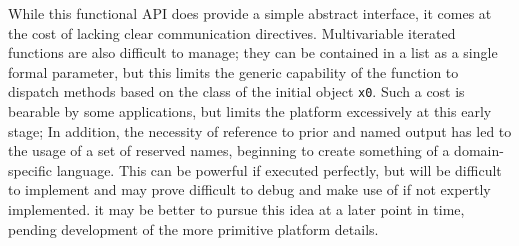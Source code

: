 \documentclass[a4paper,10pt]{article}
\begin{document}
While this functional API does provide a simple abstract interface, it comes at
the cost of lacking clear communication directives.
Multivariable iterated functions are also difficult to manage;
they can be contained in a list as a single formal parameter, but this limits
the generic capability of the function to dispatch methods based on the class
of the initial object \texttt{x0}.
Such a cost is bearable by some applications, but limits the platform
excessively at this early stage;
In addition, the necessity of reference to prior and named output has led to
the usage of a set of reserved names, beginning to create something of a
domain-specific language. 
This can be powerful if executed perfectly, but will be difficult to implement
and may prove difficult to debug and make use of if not expertly implemented.
it may be better to pursue this idea at a later point in time, pending
development of the more primitive platform details.

\printbibliography{}
\end{document}
